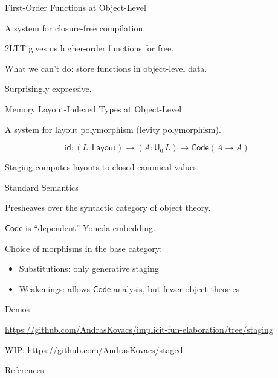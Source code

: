 \documentclass[dvipsnames,10pt,aspectratio=169]{beamer}
\newcommand{\Ty}{\mathsf{Ty}}
\renewcommand{\U}{\mathsf{U}}
\newcommand{\Code}{\mathsf{Code}}
\newcommand{\msf}[1]{\mathsf{#1}}
\begin{document}
\begin{frame}{First-Order Functions at Object-Level}

A system for closure-free compilation.
\vspace{1em}
\pause


2LTT gives us higher-order functions for free.
\vspace{1em}
\pause

What we can't do: store functions in object-level data.
\vspace{1em}
\pause

Surprisingly expressive.

\end{frame}

\begin{frame}{Memory Layout-Indexed Types at Object-Level}

A system for layout polymorphism (levity polymorphism).

\[ \msf{id} : (L : \msf{Layout}) \to (A : \U_0\,L) \to \Code(A \to A) \]

Staging computes layouts to closed canonical values.

\end{frame}

\begin{frame}{Standard Semantics}

Presheaves over the syntactic category of object theory.
\vspace{1em}
\pause

$\Code$ is ``dependent'' Yoneda-embedding.
\vspace{1em}
\pause

Choice of morphisms in the base category:
\begin{itemize}
  \pause
  \item Substitutions: only generative staging
  \pause
  \item Weakenings: allows $\Code$ analysis, but fewer object theories
\end{itemize}
\end{frame}

\begin{frame}{Demos}

\url{https://github.com/AndrasKovacs/implicit-fun-elaboration/tree/staging}
\vspace{1em}

WIP: \url{https://github.com/AndrasKovacs/staged}

\end{frame}

\begin{frame}[allowframebreaks]{References}
  
\end{frame}
\end{document}
